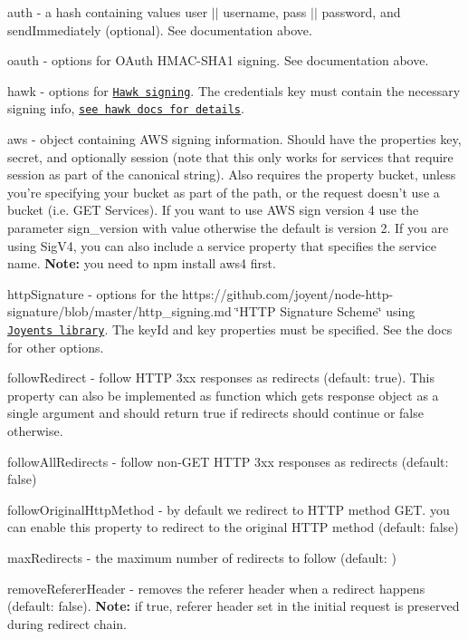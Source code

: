 \begin{DoxyItemize}
\item {\ttfamily auth} -\/ a hash containing values {\ttfamily user} $\vert$$\vert$ {\ttfamily username}, {\ttfamily pass} $\vert$$\vert$ {\ttfamily password}, and {\ttfamily send\+Immediately} (optional). See documentation above.
\item {\ttfamily oauth} -\/ options for O\+Auth H\+M\+A\+C-\/\+S\+H\+A1 signing. See documentation above.
\item {\ttfamily hawk} -\/ options for \href{https://github.com/hueniverse/hawk}{\tt Hawk signing}. The {\ttfamily credentials} key must contain the necessary signing info, \href{https://github.com/hueniverse/hawk#usage-example}{\tt see hawk docs for details}.
\item {\ttfamily aws} -\/ {\ttfamily object} containing A\+WS signing information. Should have the properties {\ttfamily key}, {\ttfamily secret}, and optionally {\ttfamily session} (note that this only works for services that require session as part of the canonical string). Also requires the property {\ttfamily bucket}, unless you’re specifying your {\ttfamily bucket} as part of the path, or the request doesn’t use a bucket (i.\+e. G\+ET Services). If you want to use A\+WS sign version 4 use the parameter {\ttfamily sign\+\_\+version} with value {} otherwise the default is version 2. If you are using Sig\+V4, you can also include a {\ttfamily service} property that specifies the service name. {\bfseries Note\+:} you need to {\ttfamily npm install aws4} first.
\item {\ttfamily http\+Signature} -\/ options for the https\+://github.com/joyent/node-\/http-\/signature/blob/master/http\+\_\+signing.\+md \char`\"{}\+H\+T\+T\+P Signature Scheme\char`\"{} using \href{https://github.com/joyent/node-http-signature}{\tt Joyent\textquotesingle{}s library}. The {\ttfamily key\+Id} and {\ttfamily key} properties must be specified. See the docs for other options. 


\item {\ttfamily follow\+Redirect} -\/ follow H\+T\+TP 3xx responses as redirects (default\+: {\ttfamily true}). This property can also be implemented as function which gets {\ttfamily response} object as a single argument and should return {\ttfamily true} if redirects should continue or {\ttfamily false} otherwise.
\item {\ttfamily follow\+All\+Redirects} -\/ follow non-\/\+G\+ET H\+T\+TP 3xx responses as redirects (default\+: {\ttfamily false})
\item {\ttfamily follow\+Original\+Http\+Method} -\/ by default we redirect to H\+T\+TP method G\+ET. you can enable this property to redirect to the original H\+T\+TP method (default\+: {\ttfamily false})
\item {\ttfamily max\+Redirects} -\/ the maximum number of redirects to follow (default\+: {})
\item {\ttfamily remove\+Referer\+Header} -\/ removes the referer header when a redirect happens (default\+: {\ttfamily false}). {\bfseries Note\+:} if true, referer header set in the initial request is preserved during redirect chain. 



\end{DoxyItemize}
